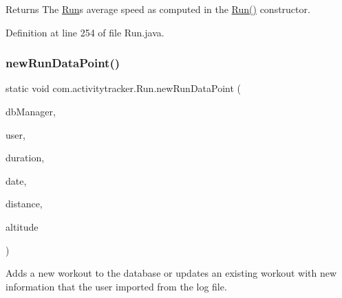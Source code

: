 \begin{DoxyReturn}{Returns}
The \mbox{\hyperlink{classcom_1_1activitytracker_1_1_run}{Run}}\textquotesingle{}s average speed as computed in the \mbox{\hyperlink{classcom_1_1activitytracker_1_1_run_a5568c1c514835056d2abc22cfba222c5}{Run()}} constructor. 
\end{DoxyReturn}


Definition at line 254 of file Run.\+java.


\begin{DoxyCode}{0}

\end{DoxyCode}
\mbox{\label{classcom_1_1activitytracker_1_1_run_a5dea6f1860431103d553ce770382afe0}} 
\subsubsection{\texorpdfstring{newRunDataPoint()}{newRunDataPoint()}}
{\footnotesize\ttfamily static void com.\+activitytracker.\+Run.\+new\+Run\+Data\+Point (\begin{DoxyParamCaption}\item[{final \mbox{\hyperlink{classcom_1_1activitytracker_1_1_d_b_manager}{D\+B\+Manager}}}]{db\+Manager,  }\item[{final \mbox{\hyperlink{classcom_1_1activitytracker_1_1_user}{User}}}]{user,  }\item[{final float}]{duration,  }\item[{final Date}]{date,  }\item[{final float}]{distance,  }\item[{final float}]{altitude }\end{DoxyParamCaption})\hspace{0.3cm}{\ttfamily [static]}}

Adds a new workout to the database or updates an existing workout with new information that the user imported from the log file.

